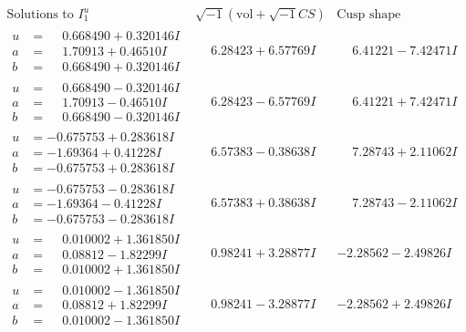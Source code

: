 \documentclass[1p]{elsarticle_modified}
\theoremstyle{definition}
\newcommand{\I}{\sqrt{-1}}
\begin{document}
$$\begin{array}{c|c|c}  
\text{Solutions to }I^u_{1}& \I (\text{vol} + \sqrt{-1}CS) & \text{Cusp shape}\\
 \hline 
\begin{aligned}
u &= \phantom{-}0.668490 + 0.320146 I \\
a &= \phantom{-}1.70913 + 0.46510 I \\
b &= \phantom{-}0.668490 + 0.320146 I\end{aligned}
 & \phantom{-}6.28423 + 6.57769 I & \phantom{-}6.41221 - 7.42471 I \\ \hline\begin{aligned}
u &= \phantom{-}0.668490 - 0.320146 I \\
a &= \phantom{-}1.70913 - 0.46510 I \\
b &= \phantom{-}0.668490 - 0.320146 I\end{aligned}
 & \phantom{-}6.28423 - 6.57769 I & \phantom{-}6.41221 + 7.42471 I \\ \hline\begin{aligned}
u &= -0.675753 + 0.283618 I \\
a &= -1.69364 + 0.41228 I \\
b &= -0.675753 + 0.283618 I\end{aligned}
 & \phantom{-}6.57383 - 0.38638 I & \phantom{-}7.28743 + 2.11062 I \\ \hline\begin{aligned}
u &= -0.675753 - 0.283618 I \\
a &= -1.69364 - 0.41228 I \\
b &= -0.675753 - 0.283618 I\end{aligned}
 & \phantom{-}6.57383 + 0.38638 I & \phantom{-}7.28743 - 2.11062 I \\ \hline\begin{aligned}
u &= \phantom{-}0.010002 + 1.361850 I \\
a &= \phantom{-}0.08812 - 1.82299 I \\
b &= \phantom{-}0.010002 + 1.361850 I\end{aligned}
 & \phantom{-}0.98241 + 3.28877 I & -2.28562 - 2.49826 I \\ \hline\begin{aligned}
u &= \phantom{-}0.010002 - 1.361850 I \\
a &= \phantom{-}0.08812 + 1.82299 I \\
b &= \phantom{-}0.010002 - 1.361850 I\end{aligned}
 & \phantom{-}0.98241 - 3.28877 I & -2.28562 + 2.49826 I \\ \hline\begin{aligned}

\end{aligned}
\end{array}$$
\end{document}
